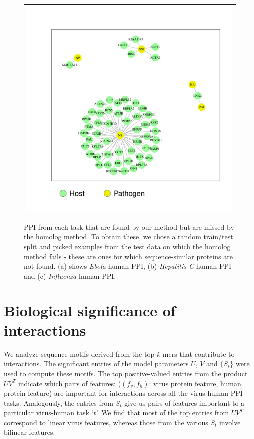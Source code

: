 \documentclass[a4paper,11pt]{article}
\begin{document}
\begin{figure}
\begin{tabular}{c}
\begin{minipage}{0.4\textwidth}
\begin{center}
\includegraphics[scale=0.25, trim = 0.5cm 0.5cm 0.5cm 0.5cm]{flunet.pdf}
\end{center}
\end{minipage}
\end{tabular}
\caption{PPI from each task that are found by our method but are missed by the homolog method. To obtain these, we chose a random train/test split and picked examples from the test data on which the homolog method fails - these are ones for which sequence-similar proteins are not found. (a) shows \textit{Ebola}-human PPI, (b) \textit{Hepatitis-C} human PPI and (c) \textit{Influenza}-human PPI.}
\label{fig:network}
\end{figure}



\section{Biological significance of interactions} 

We analyze sequence motifs derived from the top $k$-mers that contribute to interactions. The significant entries of the model parameters $U$, $V$ and $\{S_t\}$ were used to
compute these motifs. The top positive-valued entries from the product $U V^T$ indicate which pairs of features: ($(f_v, f_h)$: virus protein feature, human protein feature) are important for interactions across all the virus-human PPI tasks.
Analogously, the entries from $S_t$ give us pairs of features important to a particular virus-human task `$t$'.
We find that most of the top entries from $U V^T$ correspond to linear virus features, whereas those from the various $S_t$
involve bilinear features. 
\end{document}
